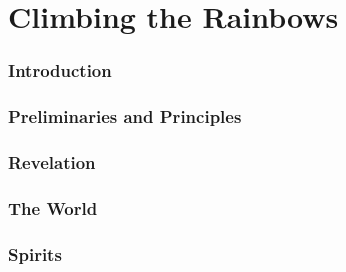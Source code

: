 \part{Climbing the Rainbows}
	\label{CTR}
	

	\section{Introduction}
		
		
		
		
	\section{Preliminaries and Principles}
	
		
		
		
			
	\section{Revelation}
			
	\section{The World}
	
			
	\section{Spirits}
	
